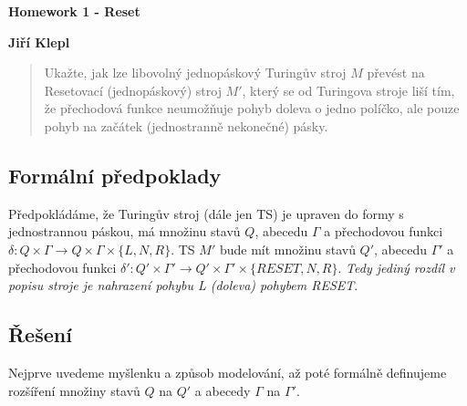 \documentclass[a4paper,12pt]{article} %
\begin{document}
\thispagestyle{empty} %

\begin{center}
    {\Large \bf Homework 1 - Reset}
    \vspace{2mm}

    {\bf Jiří Klepl}

\end{center}

\vspace{0.4cm}

\begin{quote}
    Ukažte, jak lze libovolný jednopáskový Turingův stroj $M$ převést na Resetovací (jednopáskový) stroj $M'$, který se od Turingova stroje liší tím, že přechodová funkce neumožňuje pohyb doleva o jedno políčko, ale pouze pohyb na začátek (jednostranně nekonečné) pásky.
\end{quote}

\subsection*{Formální předpoklady}

Předpokládáme, že Turingův stroj (dále jen TS) je upraven do formy s jednostrannou páskou, má množinu stavů $Q$, abecedu $\Gamma$ a přechodovou funkci $\delta : Q \times \Gamma \to Q \times \Gamma \times \{L, N, R\}$. TS $M'$ bude mít množinu stavů $Q'$, abecedu $\Gamma'$ a přechodovou funkci $\delta' : Q' \times \Gamma' \to Q' \times \Gamma' \times \{RESET, N, R\}$. \textit{Tedy jediný rozdíl v popisu stroje je nahrazení pohybu L (doleva) pohybem RESET}.

\subsection*{Řešení}

Nejprve uvedeme myšlenku a způsob modelování, až poté formálně definujeme rozšíření množiny stavů $Q$ na $Q'$ a abecedy $\Gamma$ na $\Gamma'$.
\end{document}
